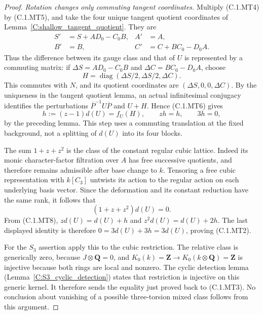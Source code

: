\begin{proof}
\emph{Rotation changes only commuting tangent coordinates.}
Multiply (C.1.MT4) by (C.1.MT5), and take the four unique
tangent quotient coordinates of
Lemma~\ref{C:shallow_tangent_quotient}.
They are
\[
 \begin{aligned}
 S'&=S+AD_0-C_0B, & A'&=A,\\
 B'&=B,          & C'&=C+BC_0-D_0A.
 \end{aligned}                                                 \tag{C.1.MT7}
\]
Thus the difference between its gauge class and that of $U$
is represented by a commuting matrix: if
$\Delta S=AD_0-C_0B$ and $\Delta C=BC_0-D_0A$, choose
\[
 H=\operatorname{diag}(\Delta S/2,\Delta S/2,\Delta C).
\]
This commutes with $N$, and its quotient coordinates are
$(\Delta S,0,0,\Delta C)$.
By the uniqueness in the tangent quotient lemma, an actual
infinitesimal conjugacy identifies the perturbations
$\overline P^{-1}U\overline P$ and $U+H$.
Hence (C.1.MT6) gives
\[
             h:=(z-1)d(U)=f_U(H),\qquad zh=h,
             \qquad 3h=0,                                \tag{C.1.MT8}
\]
by the preceding lemma.
This step uses a commuting translation at the fixed
background, not a splitting of $d(U)$ into its four blocks.

The sum $1+z+z^2$ is the class of the constant regular
cubic lattice.  Indeed its monic character-factor filtration
over $A$ has free successive quotients, and therefore
remains admissible after base change to $k$.
Tensoring a free cubic representation with $k[C_3]$
untwists its action to the regular action on each underlying
basis vector.  Since the deformation and its constant
reduction have the same rank, it follows that
\[
                       (1+z+z^2)d(U)=0.
\]
From (C.1.MT8), $zd(U)=d(U)+h$ and
$z^2d(U)=d(U)+2h$.
The last displayed identity is therefore
$0=3d(U)+3h=3d(U)$, proving (C.1.MT2).

For the $S_3$ assertion apply this to the cubic restriction.
The relative class is generically zero, because
$J\otimes\mathbf Q=0$, and
$K_0(k)=\mathbf Z\to K_0(k\otimes\mathbf Q)=\mathbf Z$
is injective because both rings are local and nonzero.
The cyclic detection lemma
(Lemma~\ref{C:S3_cyclic_detection}) states that restriction
is injective on this generic kernel.
It therefore sends the equality just proved back to
(C.1.MT3).  No conclusion about vanishing of a possible
three-torsion mixed class follows from this argument.
\end{proof}
